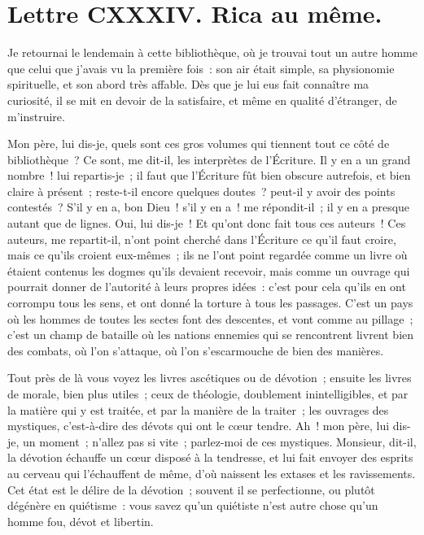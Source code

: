 \documentclass[french,twoside]{book} %
\newcommand{\dateline}[1]{\medskip{\RaggedLeft{#1}\par}\bigskip}
\begin{document}
\dateline{De Paris le 21 de la lune de Rhamazan 1719.}
\section[{Lettre CXXXIV. Rica au même.}]{Lettre CXXXIV. Rica au même.}\renewcommand{\leftmark}{Lettre CXXXIV. Rica au même.}

\noindent Je retournai le lendemain à cette bibliothèque, où je trouvai tout un autre homme que celui que j’avais vu la première fois : son air était simple, sa physionomie spirituelle, et son abord très affable. Dès que je lui eus fait connaître ma curiosité, il se mit en devoir de la satisfaire, et même en qualité d’étranger, de m’instruire.\par
Mon père, lui dis-je, quels sont ces gros volumes qui tiennent tout ce côté de bibliothèque ? Ce sont, me dit-il, les interprètes de l’Écriture. Il y en a un grand nombre ! lui repartis-je ; il faut que l’Écriture fût bien obscure autrefois, et bien claire à présent ; reste-t-il encore quelques doutes ? peut-il y avoir des points contestés ? S’il y en a, bon Dieu ! s’il y en a ! me répondit-il ; il y en a presque autant que de lignes. Oui, lui dis-je ! Et qu’ont donc fait tous ces auteurs ! Ces auteurs, me repartit-il, n’ont point cherché dans l’Écriture ce qu’il faut croire, mais ce qu’ils croient eux-mêmes ; ils ne l’ont point regardée comme un livre où étaient contenus les dogmes qu’ils devaient recevoir, mais comme un ouvrage qui pourrait donner de l’autorité à leurs propres idées : c’est pour cela qu’ils en ont corrompu tous les sens, et ont donné la torture à tous les passages. C’est un pays où les hommes de toutes les sectes font des descentes, et vont comme au pillage ; c’est un champ de bataille où les nations ennemies qui se rencontrent livrent bien des combats, où l’on s’attaque, où l’on s’escarmouche de bien des manières.\par
Tout près de là vous voyez les livres ascétiques ou de dévotion ; ensuite les livres de morale, bien plus utiles ; ceux de théologie, doublement inintelligibles, et par la matière qui y est traitée, et par la manière de la traiter ; les ouvrages des mystiques, c’est-à-dire des dévots qui ont le cœur tendre. Ah ! mon père, lui dis-je, un moment ; n’allez pas si vite ; parlez-moi de ces mystiques. Monsieur, dit-il, la dévotion échauffe un cœur disposé à la tendresse, et lui fait envoyer des esprits au cerveau qui l’échauffent de même, d’où naissent les extases et les ravissements. Cet état est le délire de la dévotion ; souvent il se perfectionne, ou plutôt dégénère en quiétisme : vous savez qu’un quiétiste n’est autre chose qu’un homme fou, dévot et libertin.\par
\end{document}
